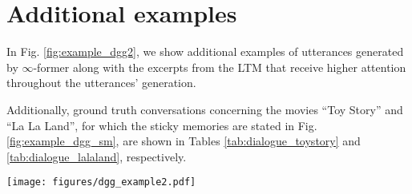 \documentclass[11pt]{article}
\begin{document}
\section{Additional examples}
\label{sec:examples}
In Fig. \ref{fig:example_dgg2}, we show additional examples of utterances generated by \mbox{$\infty$-former} along with the excerpts from the LTM that receive higher attention throughout the utterances' generation.

Additionally, ground truth conversations concerning the movies ``Toy Story'' and ``La La Land'', for which the sticky memories are stated in Fig. \ref{fig:example_dgg_sm}, are shown in Tables \ref{tab:dialogue_toystory} and \ref{tab:dialogue_lalaland}, respectively.

\begin{figure*}[t]
  \centering
    \texttt{[image: figures/dgg\_example2.pdf]}
  \caption{Examples of answers generated by \mbox{$\infty$-former} on a dialogue about the movie ``The Social Network''. The excerpts from the LTM that are more attended to throughout their generation are highlighted on each color correspondingly.}
  \label{fig:example_dgg2}
\end{figure*}
\end{document}
